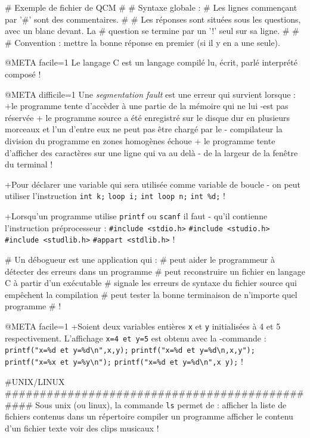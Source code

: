 # Exemple de fichier de QCM
#
# Syntaxe globale :
# Les lignes commençant par '#' sont des commentaires.
#
# Les réponses sont situées sous les questions, avec un blanc devant. La
# question se termine par un '!' seul sur sa ligne.
#
#
# Convention : mettre la bonne réponse en premier (si il y en a une seule).

@META facile=1
Le langage C est un langage
 compilé
 lu, écrit, parlé
 interprété
 composé
!

@META difficile=1
Une \emph{segmentation fault} est une erreur qui survient lorsque :
+le programme tente d'accèder à une partie de la mémoire qui ne lui
-est pas réservée
+ le programme source a été enregistré sur le disque dur en plusieurs
  morceaux et l'un d'entre eux ne peut pas être chargé par le
- compilateur
 la division du programme en zones homogènes échoue
+ le programme tente d'afficher des caractères sur une ligne qui va au delà
- de la largeur de la fenêtre du terminal
!

+Pour déclarer une variable qui sera utilisée comme variable de boucle
- on peut utiliser l'instruction
  \verb|int k;|
  \verb|loop i;|
  \verb|int loop n;|
  \verb|int %d;|
!

+Lorsqu'un programme utilise \verb|printf| ou \verb|scanf| il faut
- qu'il contienne l'instruction préprocesseur :
 \verb|#include <stdio.h>|
 \verb|#include <studio.h>|
 \verb|#include <studlib.h>|
 \verb|#appart <stdlib.h>|
!



# Un débogueur est une application qui :
#  peut aider le programmeur à détecter des erreurs dans un programme
#  peut reconstruire un fichier en langage C à partir d'un exécutable
#  signale les erreurs de syntaxe du fichier source qui empêchent la compilation 
#  peut tester la bonne terminaison de n'importe quel programme
# !

@META facile=1
+Soient deux variables entières \verb|x| et \verb|y| initialisées à
4 et 5 respectivement. L'affichage \verb|x=4 et y=5| est obtenu avec la
-commande :
 \verb|printf("x=%d et y=%d\n",x,y);|
 \verb|printf("x=%d et y=%d\n,x,y");|
 \verb|printf("x=%x et y=%y\n");|
 \verb|printf("x=%d et y=%d\n",x y);|
!



#UNIX/LINUX ###############################################
Sous unix (ou linux), la commande \verb|ls| permet de :
 afficher la liste de fichiers contenus dans un répertoire
 compiler un programme
 afficher le contenu d'un fichier texte
 voir des clips musicaux
!

